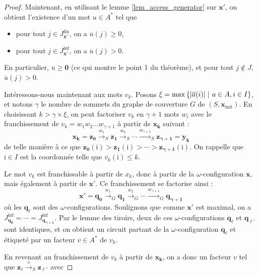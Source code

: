 \documentclass[a4paper,final]{article}
\theoremstyle{definition}
\let\leq\leqslant
\let\geq\geqslant
\newcommand{\set}[2]{\left\{#1\mathrel{\left|\vphantom{#1}\vphantom{#2}\right.}#2\right\}}
\newcommand{\eqfin}{\ensuremath{=_\text{fin}}}
\newcommand{\abs}[1]{\ensuremath{\displaystyle\left\lvert #1 \right\rvert}}
\newcommand{\trans}[2]{\ensuremath{\stackrel{#1}{\longrightarrow}_{#2}}}
\newcommand{\vect}[1]{\ensuremath{\mathbf{#1}}}
\newcommand{\xinit}{\ensuremath{\vect{x}_\text{init}}}
\newcommand{\valeur}[1]{\ensuremath{\overline{#1}}}
\newcommand{\Jfin}[1]{J^\text{fin}_{#1}}
\newcommand{\Jinf}[1]{J^\text{inf}_{#1}}
\begin{document}
\begin{proof}
Maintenant, en utilisant le lemme \ref{lem_access_generator} sur $\vect{x'}$, on obtient l'existence d'un mot $u\in A^*$ tel que 
\begin{itemize}
    \item pour tout $j\in\Jfin{\vect{x'}}$, on a $\valeur{u}(j) \geq 0$,
    \item pour tout $j\in\Jinf{\vect{x'}}$, on a $\valeur{u}(j) > 0$.
\end{itemize}
En particulier, $\valeur{u} \geq \vect{0}$ (ce qui montre le point 1 du théorème), 
et pour tout $j \notin J$, $\valeur{u}(j) > 0$.
\vspace{4mm}

Intéressons-nous maintenant aux mots $v_k$.
Posons $\xi = \max \set{\abs{\valeur{a}(i)}} {a\in A,i\in I}$, et notons $\gamma$ le nombre de sommets du graphe de couverture $G$ de $(S,\xinit)$.
En choisissant $k > \gamma \times \xi$, on peut factoriser $v_k$ en $\gamma + 1$ mots $w_i$ 
avec le franchissement de $v_k = w_1 w_2 \dots w_{\gamma + 1}$ à partir de $\vect{x_k}$ suivant :
$$\vect{x_k} = \vect{z_0} \trans{w_1}{S} \vect{z_1} \trans{w_2}{S} \cdots \trans{w_{\gamma + 1}}{S} \vect{z_{\gamma + 1}} = \vect{y_k}$$
de telle manière à ce que $\vect{z_0}(\mathrm{i}) > \vect{z_1}(\mathrm{i}) > \cdots > \vect{z_{\gamma + 1}}(\mathrm{i})$.
On rappelle que $\mathrm{i} \in I$ est la coordonnée telle que $\valeur{v_k}(\mathrm{i}) \leq k$.

Le mot $v_k$ est franchissable à partir de $x_k$, donc à partir de la $\omega$-configuration $\vect{x}$, mais également à partir de $\vect{x'}$.
Ce franchissement se factorise ainsi :
$$\vect{x'} = \vect{q_0} \trans{w_1}{G} \vect{q_1} \trans{w_2}{G} \cdots \trans{w_{\gamma + 1}}{G} \vect{q_{\gamma + 1}}$$
où les $\vect{q_\ell}$ sont des $\omega$-configurations.
Soulignons que comme $\vect{x'}$ est maximal, on a $\Jinf{\vect{q_0}} = \cdots = \Jinf{\vect{q_{\gamma+1}}}$.
Par le lemme des tiroirs, deux de ces $\omega$-configurations $\vect{q_\ell}$ et $\vect{q_{\ell'}}$ sont identiques, et on obtient un circuit partant de la $\omega$-configuration $\vect{q_\ell}$ et étiqueté par un facteur $v\in A^*$ de $v_k$.

\vspace{2mm}
En revenant au franchissement de $v_k$ à partir de $\vect{x_k}$, on a donc un facteur $v$ tel que $\vect{z_\ell} \trans{v}{S} \vect{z_{\ell'}}$ avec


\end{proof}
\end{document}
